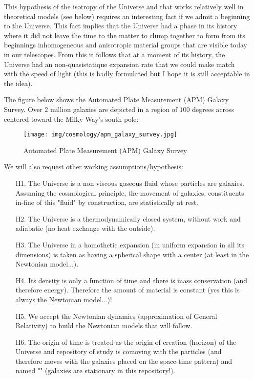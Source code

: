 	\begin{tcolorbox}[title=Remark,colframe=black,arc=10pt]
	This hypothesis of the isotropy of the Universe and that works relatively well in theoretical models (see below) requires an interesting fact if we admit a beginning to the Universe. This fact implies that the Universe had a phase in its history where it did not leave the time to the matter to clump together to form from its beginnings inhomogeneous and anisotropic material groups that are visible today in our telescopes. From this it follows that at a moment of its history, the Universe had an non-quasistatique expansion rate that we could make match with the speed of light (this is badly formulated but I hope it is still acceptable in the idea).
	\end{tcolorbox}
	The figure below shows the Automated Plate Measurement (APM) Galaxy Survey. Over $2$ million galaxies are depicted in a region of $100$
degrees across centered toward the Milky Way's south pole:
	\begin{figure}[H]
		\centering
		\texttt{[image: img/cosmology/apm\_galaxy\_survey.jpg]}	
		\caption{Automated Plate Measurement (APM) Galaxy Survey}
	\end{figure}
	We will also request other working assumptions/hypothesis:
	\begin{itemize}
		\item[H1.] The Universe is a non viscous gaseous fluid whose particles are galaxies. Assuming the cosmological principle, the movement of galaxies, constituents in-fine of this "fluid" by construction, are statistically at rest.
		
		\item[H2.] The Universe is a thermodynamically closed system, without work and adiabatic (no heat exchange with the outside).
		
		\item[H3.] The Universe in a homothetic expansion (in uniform expansion in all its dimensions) is taken as having a spherical shape with a center (at least in the Newtonian model...).
		
		\item[H4.] Its density is only a function of time and there is mass conservation (and therefore energy). Therefore the amount of material is constant (yes this is always the Newtonian model...)!
		
		\item[H5.] We accept the Newtonian dynamics (approximation of General Relativity) to build the Newtonian models that will follow.
		
		\item[H6.] The origin of time is treated as the origin of creation (horizon) of the Universe and repository of study is comoving with the particles (and therefore moves with the galaxies placed on the space-time pattern) and named "" (galaxies are stationary in this repository!).
	\end{itemize}

